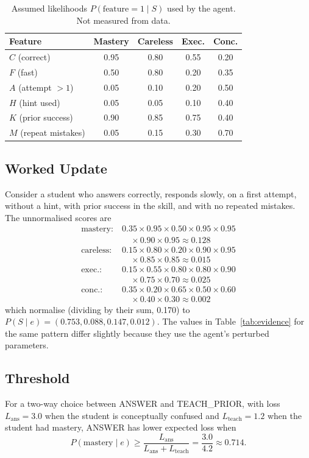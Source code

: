 \documentclass[10pt,letterpaper,twocolumn]{article}
\begin{document}
\begin{table}[t]
\centering
\footnotesize
\caption{Assumed likelihoods $P(\text{feature}=1 \mid S)$ used by the agent. Not measured from data.}
\label{tab:lik}
\begin{tabular}{@{}lcccc@{}}
\toprule
Feature & Mastery & Careless & Exec. & Conc. \\
\midrule
$C$ (correct) & 0.95 & 0.80 & 0.55 & 0.20 \\
$F$ (fast) & 0.50 & 0.80 & 0.20 & 0.35 \\
$A$ (attempt $>1$) & 0.05 & 0.10 & 0.20 & 0.50 \\
$H$ (hint used) & 0.05 & 0.05 & 0.10 & 0.40 \\
$K$ (prior success) & 0.90 & 0.85 & 0.75 & 0.40 \\
$M$ (repeat mistakes) & 0.05 & 0.15 & 0.30 & 0.70 \\
\bottomrule
\end{tabular}
\end{table}

\subsection{Worked Update}
Consider a student who answers correctly, responds slowly, on a first attempt, without a hint, with prior success in the skill, and with no repeated mistakes. The unnormalised scores are
\begin{align*}
\text{mastery:}\ & 0.35\times0.95\times0.50\times0.95\times0.95 \\
& \quad\times0.90\times0.95 \approx 0.128\\
\text{careless:}\ & 0.15\times0.80\times0.20\times0.90\times0.95 \\
& \quad\times0.85\times0.85 \approx 0.015\\
\text{exec.:}\ & 0.15\times0.55\times0.80\times0.80\times0.90 \\
& \quad\times0.75\times0.70 \approx 0.025\\
\text{conc.:}\ & 0.35\times0.20\times0.65\times0.50\times0.60 \\
& \quad\times0.40\times0.30 \approx 0.002
\end{align*}
which normalise (dividing by their sum, 0.170) to $P(S\mid e) = (0.753, 0.088, 0.147, 0.012)$. The values in Table~\ref{tab:evidence} for the same pattern differ slightly because they use the agent's perturbed parameters.

\subsection{Threshold}
For a two-way choice between ANSWER and TEACH\_PRIOR, with loss $L_{\text{ans}}=3.0$ when the student is conceptually confused and $L_{\text{teach}}=1.2$ when the student had mastery, ANSWER has lower expected loss when
\begin{equation}
P(\text{mastery}\mid e) \geq \frac{L_{\text{ans}}}{L_{\text{ans}}+L_{\text{teach}}} = \frac{3.0}{4.2} \approx 0.714.
\end{equation}
\end{document}
